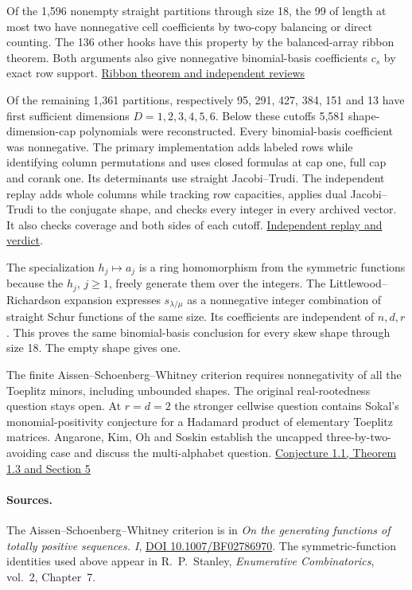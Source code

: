 \documentclass[11pt]{article}
\begin{document}
Of the 1,596 nonempty straight partitions through size 18, the 99 of length at most two have nonnegative cell coefficients by two-copy balancing or direct counting. The 136 other hooks have this property by the balanced-array ribbon theorem. Both arguments also give nonnegative binomial-basis coefficients $c_s$ by exact row support. \href{https://github.com/ProgramComputer/open-math-research/blob/172dabe7220ba9f23fe41f1589c1ba461f193b6a/topics/balanced-arrays/koszul-ribbons/README.md}{Ribbon theorem and independent reviews}

Of the remaining 1,361 partitions, respectively 95, 291, 427, 384, 151 and 13 have first sufficient dimensions $D=1,2,3,4,5,6$. Below these cutoffs 5,581 shape-dimension-cap polynomials were reconstructed. Every binomial-basis coefficient was nonnegative. The primary implementation adds labeled rows while identifying column permutations and uses closed formulas at cap one, full cap and corank one. Its determinants use straight Jacobi--Trudi. The independent replay adds whole columns while tracking row capacities, applies dual Jacobi--Trudi to the conjugate shape, and checks every integer in every archived vector. It also checks coverage and both sides of each cutoff. \href{https://github.com/ProgramComputer/open-math-research/tree/main/topics/balanced-arrays/fixed-shapes/fixed-minor-review}{Independent replay and verdict}.

The specialization $h_j\mapsto a_j$ is a ring homomorphism from the symmetric functions because the $h_j$, $j\ge1$, freely generate them over the integers. The Littlewood--Richardson expansion expresses $s_{\lambda/\mu}$ as a nonnegative integer combination of straight Schur functions of the same size. Its coefficients are independent of $n,d,r$. This proves the same binomial-basis conclusion for every skew shape through size 18. The empty shape gives one.

The finite Aissen--Schoenberg--Whitney criterion requires nonnegativity of all the Toeplitz minors, including unbounded shapes. The original real-rootedness question stays open. At $r=d=2$ the stronger cellwise question contains Sokal's monomial-positivity conjecture for a Hadamard product of elementary Toeplitz matrices. Angarone, Kim, Oh and Soskin establish the uncapped three-by-two-avoiding case and discuss the multi-alphabet question. \href{https://arxiv.org/html/2511.08969v1}{Conjecture 1.1, Theorem 1.3 and Section 5}


\paragraph{Sources.}
The Aissen--Schoenberg--Whitney criterion is in
\emph{On the generating functions of totally positive sequences. I},
\href{https://doi.org/10.1007/BF02786970}{DOI 10.1007/BF02786970}.
The symmetric-function identities used above appear in
R.~P.~Stanley, \emph{Enumerative Combinatorics}, vol.~2, Chapter~7.
\end{document}

